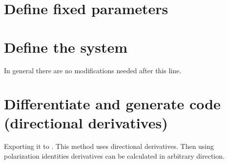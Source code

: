 \documentclass[letterpaper,10pt,english]{jupyterBook}
\begin{document}
\section{Define fixed parameters}
\label{\detokenize{PredatorPreyGenSym:define-fixed-parameters}}
\begin{sphinxVerbatim}[commandchars=\\\{\}]
  
  
  
\end{sphinxVerbatim}


\section{Define the system}
\label{\detokenize{PredatorPreyGenSym:define-the-system}}
\begin{sphinxVerbatim}[commandchars=\\\{\}]
    
    
  \PYG{p}{[} \PYG{p}{]}
\end{sphinxVerbatim}

\sphinxAtStartPar
In general there are no modifications needed after this line.


\section{Differentiate and generate code (directional derivatives)}
\label{\detokenize{PredatorPreyGenSym:differentiate-and-generate-code-directional-derivatives}}
\sphinxAtStartPar
Exporting it to . This method uses directional derivatives.
Then using polarization identities derivatives can be calculated in arbitrary
direction.
\end{document}
